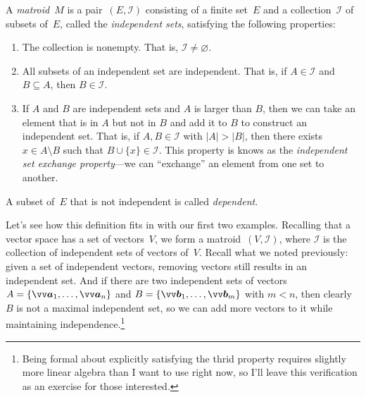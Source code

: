 \documentclass[twoside]{article}
\newcommand{\I}{\mathcal{I}}
\begin{document}
\begin{defn}[Matroid]
  A \emph{matroid}~$M$ is a pair~$(E, \I)$ consisting of a finite set~$E$ and a collection~$\I$ of subsets of~$E$, called the \emph{independent sets}, satisfying the following properties:
  \begin{enumerate}
    \item The collection is nonempty.
      That is, ${\I \ne \varnothing}$.
    \item All subsets of an independent set are independent.
      That is, if ${A \in \I}$ and ${B \subseteq A}$, then ${B \in \I}$.
    \item If $A$ and $B$ are independent sets and $A$ is larger than $B$, then we can take an element that is in $A$ but not in $B$ and add it to $B$ to construct an independent set.
    That is, if ${A, B \in \I}$ with ${|A| > |B|}$, then there exists ${x \in A \setminus B}$ such that ${B \cup \{x\} \in \I}$.
    This property is knows as the \emph{independent set exchange property}---we can ``exchange'' an element from one set to another.
  \end{enumerate}
  A subset of~$E$ that is not independent is called \emph{dependent}.
\end{defn}

Let's see how this definition fits in with our first two examples.
Recalling that a vector space has a set of vectors~$V$, we form a matroid~$(V, \I)$, where $\I$ is the collection of independent sets of vectors of~$V$.
Recall what we noted previously: given a set of independent vectors, removing vectors still results in an independent set.
And if there are two independent sets of vectors ${A = \{\bv{a}_1, \ldots, \bv{a}_n\}}$ and ${B = \{\bv{b}_1, \ldots, \bv{b}_m\}}$ with ${m < n}$, then clearly $B$ is not a maximal independent set, so we can add more vectors to it while maintaining independence.\footnote{
  Being formal about explicitly satisfying the thrid property requires slightly more linear algebra than I want to use right now, so I'll leave this verification as an exercise for those interested.
}
\end{document}
